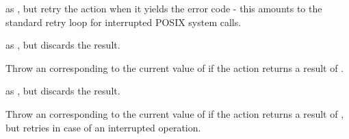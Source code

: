 \begin{haddockdesc}
\item[\begin{tabular}{@{}l}
throwErrnoIfRetry :: (a -> Bool) -> String -> IO a -> IO a
\end{tabular}]
{\haddockbegindoc
as , but retry the  action when it yields the
 error code  - this amounts to the standard retry loop for
 interrupted POSIX system calls.\par}
\end{haddockdesc}
\begin{haddockdesc}
\item[\begin{tabular}{@{}l}
throwErrnoIfRetry{\char '137} :: (a -> Bool) -> String -> IO a -> IO ()
\end{tabular}]
{\haddockbegindoc
as , but discards the result.\par}
\end{haddockdesc}
\begin{haddockdesc}
\item[\begin{tabular}{@{}l}
throwErrnoIfMinus1 :: (Eq a, Num a) => String -> IO a -> IO a
\end{tabular}]
{\haddockbegindoc
Throw an  corresponding to the current value of 
 if the  action returns a result of .\par}
\end{haddockdesc}
\begin{haddockdesc}
\item[\begin{tabular}{@{}l}
throwErrnoIfMinus1{\char '137} :: (Eq a, Num a) => String -> IO a -> IO ()
\end{tabular}]
{\haddockbegindoc
as , but discards the result.\par}
\end{haddockdesc}
\begin{haddockdesc}
\item[\begin{tabular}{@{}l}
throwErrnoIfMinus1Retry :: (Eq a, Num a) => String -> IO a -> IO a
\end{tabular}]
{\haddockbegindoc
Throw an  corresponding to the current value of 
 if the  action returns a result of , but retries in case of
 an interrupted operation.\par}
\end{haddockdesc}

